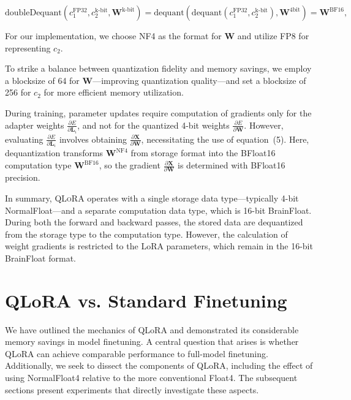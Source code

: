 \begin{equation}
    \text{doubleDequant}(c_1^{\text{FP32}}, c_2^{\text{k-bit}}, \mathbf{W}^{\text{k-bit}}) = \text{dequant}(\text{dequant}(c_1^{\text{FP32}}, c_2^{\text{k-bit}}), \mathbf{W}^{\text{4bit}}) = \mathbf{W}^{\text{BF16}},
\end{equation}

For our implementation, we choose NF4 as the format for $\mathbf{W}$ and utilize FP8 for representing $c_2$.

To strike a balance between quantization fidelity and memory savings, we employ a blocksize of 64 for $\mathbf{W}$—improving quantization quality—and set a blocksize of 256 for $c_2$ for more efficient memory utilization.

During training, parameter updates require computation of gradients only for the adapter weights $\frac{\partial E}{\partial \mathbf{L}_i}$, and not for the quantized 4-bit weights $\frac{\partial E}{\partial \mathbf{W}}$. However, evaluating $\frac{\partial E}{\partial \mathbf{L}_i}$ involves obtaining $\frac{\partial \mathbf{X}}{\partial \mathbf{W}}$, necessitating the use of equation~(5). Here, dequantization transforms $\mathbf{W}^{\text{NF4}}$ from storage format into the BFloat16 computation type $\mathbf{W}^{\text{BF16}}$, so the gradient $\frac{\partial \mathbf{X}}{\partial \mathbf{W}}$ is determined with BFloat16 precision.

In summary, \textsc{QLoRA} operates with a single storage data type—typically 4-bit NormalFloat—and a separate computation data type, which is 16-bit BrainFloat. During both the forward and backward passes, the stored data are dequantized from the storage type to the computation type. However, the calculation of weight gradients is restricted to the LoRA parameters, which remain in the 16-bit BrainFloat format.

\section{QLoRA vs. Standard Finetuning}
\label{sec:comp_to_std}

We have outlined the mechanics of QLoRA and demonstrated its considerable memory savings in model finetuning. A central question that arises is whether QLoRA can achieve comparable performance to full-model finetuning. Additionally, we seek to dissect the components of QLoRA, including the effect of using NormalFloat4 relative to the more conventional Float4. The subsequent sections present experiments that directly investigate these aspects.

